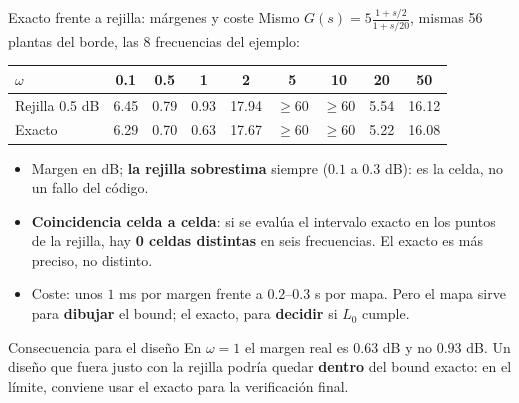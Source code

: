 \documentclass[aspectratio=169,11pt]{beamer}
\begin{document}
\begin{frame}{Exacto frente a rejilla: márgenes y coste}
  \small
  Mismo $G(s)=5\frac{1+s/2}{1+s/20}$, mismas 56 plantas del borde, las 8 frecuencias del ejemplo:
  \begin{center}\footnotesize
  \begin{tabular}{lcccccccc}
    \hline
    $\omega$ & 0.1 & 0.5 & 1 & 2 & 5 & 10 & 20 & 50\\
    \hline
    Rejilla 0.5 dB & 6.45 & 0.79 & 0.93 & 17.94 & $\ge$60 & $\ge$60 & 5.54 & 16.12\\
    Exacto & 6.29 & 0.70 & 0.63 & 17.67 & $\ge$60 & $\ge$60 & 5.22 & 16.08\\
    \hline
  \end{tabular}
  \end{center}
  \begin{itemize}
    \item Margen en dB; \textbf{la rejilla sobrestima} siempre ($0.1$ a $0.3$ dB): es la celda, no un fallo del código.
    \item \textbf{Coincidencia celda a celda}: si se evalúa el intervalo exacto en los puntos de la rejilla, hay \textbf{0 celdas distintas} en seis frecuencias. El exacto es más preciso, no distinto.
    \item Coste: unos $1$ ms por margen frente a $0.2$--$0.3$ s por mapa. Pero el mapa sirve para \textbf{dibujar} el bound; el exacto, para \textbf{decidir} si $L_0$ cumple.
  \end{itemize}
  \begin{alertblock}{Consecuencia para el diseño}
    En $\omega=1$ el margen real es $0.63$ dB y no $0.93$ dB. Un diseño que fuera justo con la rejilla podría quedar \textbf{dentro} del bound exacto: en el límite, conviene usar el exacto para la verificación final.
  \end{alertblock}
\end{frame}
\end{document}
